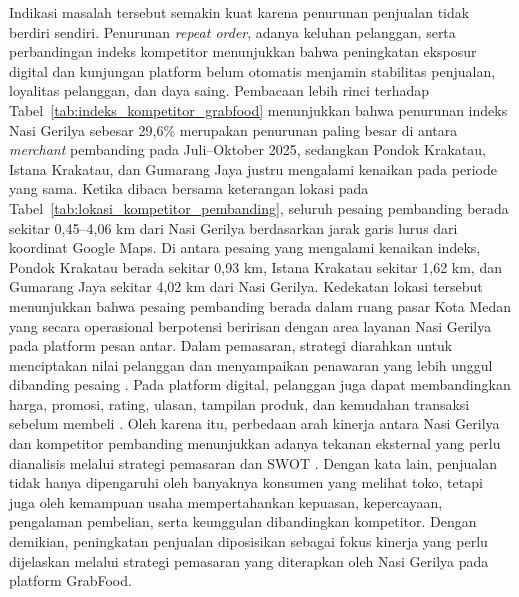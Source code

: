 Indikasi masalah tersebut semakin kuat karena penurunan penjualan tidak berdiri sendiri. Penurunan \textit{repeat order}, adanya keluhan pelanggan, serta perbandingan indeks kompetitor menunjukkan bahwa peningkatan eksposur digital dan kunjungan platform belum otomatis menjamin stabilitas penjualan, loyalitas pelanggan, dan daya saing. Pembacaan lebih rinci terhadap Tabel~\ref{tab:indeks_kompetitor_grabfood} menunjukkan bahwa penurunan indeks Nasi Gerilya sebesar 29,6\% merupakan penurunan paling besar di antara \textit{merchant} pembanding pada Juli--Oktober 2025, sedangkan Pondok Krakatau, Istana Krakatau, dan Gumarang Jaya justru mengalami kenaikan pada periode yang sama. Ketika dibaca bersama keterangan lokasi pada Tabel~\ref{tab:lokasi_kompetitor_pembanding}, seluruh pesaing pembanding berada sekitar 0,45--4,06 km dari Nasi Gerilya berdasarkan jarak garis lurus dari koordinat Google Maps. Di antara pesaing yang mengalami kenaikan indeks, Pondok Krakatau berada sekitar 0,93 km, Istana Krakatau sekitar 1,62 km, dan Gumarang Jaya sekitar 4,02 km dari Nasi Gerilya. Kedekatan lokasi tersebut menunjukkan bahwa pesaing pembanding berada dalam ruang pasar Kota Medan yang secara operasional berpotensi beririsan dengan area layanan Nasi Gerilya pada platform pesan antar. Dalam pemasaran, strategi diarahkan untuk menciptakan nilai pelanggan dan menyampaikan penawaran yang lebih unggul dibanding pesaing \parencite{kotler2023principlesmarketing}. Pada platform digital, pelanggan juga dapat membandingkan harga, promosi, rating, ulasan, tampilan produk, dan kemudahan transaksi sebelum membeli \parencite{chaffey2022digitalmarketing,sophia2025rendanggadih,suharjo2020bogorsnacks}. Oleh karena itu, perbedaan arah kinerja antara Nasi Gerilya dan kompetitor pembanding menunjukkan adanya tekanan eksternal yang perlu dianalisis melalui strategi pemasaran dan SWOT \parencite{david2023strategicmanagement,rangkuti2016analisisSWOT}. Dengan kata lain, penjualan tidak hanya dipengaruhi oleh banyaknya konsumen yang melihat toko, tetapi juga oleh kemampuan usaha mempertahankan kepuasan, kepercayaan, pengalaman pembelian, serta keunggulan dibandingkan kompetitor. Dengan demikian, peningkatan penjualan diposisikan sebagai fokus kinerja yang perlu dijelaskan melalui strategi pemasaran yang diterapkan oleh Nasi Gerilya pada platform GrabFood.

